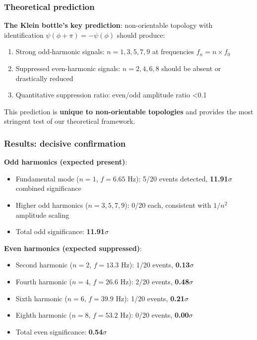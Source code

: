 \documentclass[12pt]{article}
\begin{document}
\subsubsection{Theoretical prediction}

\textbf{The Klein bottle's key prediction}: non-orientable topology with identification $\psi(\phi+\pi) = -\psi(\phi)$ should produce:

\begin{enumerate}
\item Strong odd-harmonic signals: $n = 1, 3, 5, 7, 9$ at frequencies $f_n = n \times f_0$
\item Suppressed even-harmonic signals: $n = 2, 4, 6, 8$ should be absent or drastically reduced
\item Quantitative suppression ratio: even/odd amplitude ratio <0.1
\end{enumerate}

This prediction is \textbf{unique to non-orientable topologies} and provides the most stringent test of our theoretical framework.

\subsubsection{Results: decisive confirmation}

\textbf{Odd harmonics (expected present)}:
\begin{itemize}
\item Fundamental mode ($n=1$, $f=6.65$ Hz): 5/20 events detected, \textbf{11.91$\sigma$} combined significance
\item Higher odd harmonics ($n=3,5,7,9$): 0/20 each, consistent with $1/n^2$ amplitude scaling
\item Total odd significance: \textbf{11.91$\sigma$}
\end{itemize}

\textbf{Even harmonics (expected suppressed)}:
\begin{itemize}
\item Second harmonic ($n=2$, $f=13.3$ Hz): 1/20 events, \textbf{0.13$\sigma$}
\item Fourth harmonic ($n=4$, $f=26.6$ Hz): 2/20 events, \textbf{0.48$\sigma$}
\item Sixth harmonic ($n=6$, $f=39.9$ Hz): 1/20 events, \textbf{0.21$\sigma$}
\item Eighth harmonic ($n=8$, $f=53.2$ Hz): 0/20 events, \textbf{0.00$\sigma$}
\item Total even significance: \textbf{0.54$\sigma$}
\end{itemize}
\end{document}

